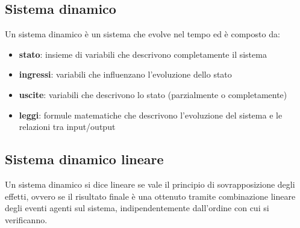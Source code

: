 \subsection{Sistema dinamico}
Un sistema dinamico è un sistema che evolve nel tempo ed è composto da:
\begin{itemize}
	\item \textbf{stato}: insieme di variabili che descrivono completamente il sistema
	\item \textbf{ingressi}: variabili che influenzano l'evoluzione dello stato
	\item \textbf{uscite}: variabili che descrivono lo stato (parzialmente o completamente)
	\item \textbf{leggi}: formule matematiche che descrivono l'evoluzione del sistema e le relazioni tra input/output
\end{itemize}

\subsection{Sistema dinamico lineare}
Un sistema dinamico si dice lineare se vale il principio di sovrapposizione degli effetti, ovvero se il risultato finale è una
ottenuto tramite combinazione lineare degli eventi agenti sul sistema, indipendentemente dall'ordine con cui si verificanno.
